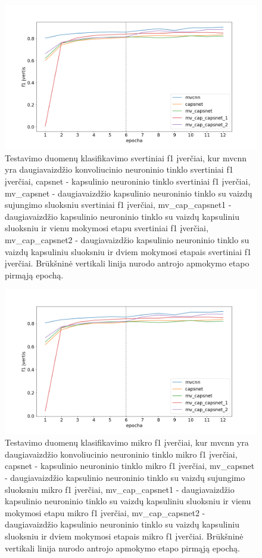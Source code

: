 \begin{figure}[H]
	\centering
	\includegraphics[scale=0.4]{img/weighted.png}
	\caption{
		Testavimo duomenų klasifikavimo svertiniai f1 įverčiai, kur mvcnn yra daugiavaizdžio konvoliucinio neuroninio tinklo svertiniai f1 įverčiai, capsnet - kapsulinio neuroninio tinklo svertiniai f1 įverčiai, mv\_capsnet - daugiavaizdžio kapsulinio neuroninio tinklo su vaizdų sujungimo sluoksniu svertiniai f1 įverčiai, mv\_cap\_capsnet1 - daugiavaizdžio kapsulinio neuroninio tinklo su vaizdų kapsuliniu sluoksniu ir vienu mokymosi etapu svertiniai f1 įverčiai, mv\_cap\_capsnet2 - daugiavaizdžio kapsulinio neuroninio tinklo su vaizdų kapsuliniu sluoksniu ir dviem mokymosi etapais svertiniai f1 įverčiai. Brūkšninė vertikali linija nurodo antrojo apmokymo etapo pirmąją epochą.
	}
	\label{img:weighted_f1}
\end{figure}

\begin{figure}[H]
	\centering
	\includegraphics[scale=0.4]{img/micro.png}
	\caption{
		Testavimo duomenų klasifikavimo mikro f1 įverčiai, kur mvcnn yra daugiavaizdžio konvoliucinio neuroninio tinklo mikro f1 įverčiai, capsnet - kapsulinio neuroninio tinklo mikro f1 įverčiai, mv\_capsnet - daugiavaizdžio kapsulinio neuroninio tinklo su vaizdų sujungimo sluoksniu mikro f1 įverčiai, mv\_cap\_capsnet1 - daugiavaizdžio kapsulinio neuroninio tinklo su vaizdų kapsuliniu sluoksniu ir vienu mokymosi etapu mikro f1 įverčiai, mv\_cap\_capsnet2 - daugiavaizdžio kapsulinio neuroninio tinklo su vaizdų kapsuliniu sluoksniu ir dviem mokymosi etapais mikro f1 įverčiai. Brūkšninė vertikali linija nurodo antrojo apmokymo etapo pirmąją epochą.
	}
	\label{img:micro_f1}
\end{figure}

